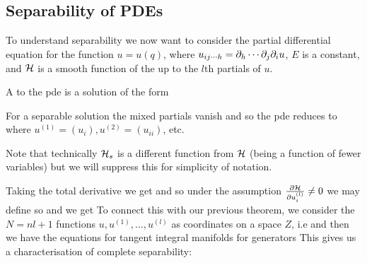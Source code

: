 \documentclass{article}
\begin{document}
\subsection{Separability of PDEs}

To understand separability we now want to consider the partial differential equation 
for the function $u = u(q)$, where $u_{ij \cdots h} = \del_h \cdots \del_j \del_i u$, $E$ is a constant, and $\mc{H}$ is a smooth function of the up to the $l$th partials of $u$. 

\begin{definition}
A  to the pde is a solution of the form 
\end{definition}

For a separable solution the mixed partials vanish and so the pde reduces to 
where $u^{(1)} = (u_i), u^{(2)} = (u_{ii})$, etc. 

\begin{notation}
Note that technically $\mc{H}_s$ is a different function from $\mc{H}$ (being a function of fewer variables) but we will suppress this for simplicity of notation. 
\end{notation}

Taking the total derivative we get 
and so under the assumption $\pd[\mc{H}]{u_i^{(l)}} \neq 0$ we may define 
so 
and we get
To connect this with our previous theorem, we consider the $N = nl+1$ functions $u,u^{(1)}, \dots, u^{(l)}$ as coordinates on a space $Z$, i.e 
and then we have the equations for tangent integral manifolds for generators 
This gives us a characterisation of complete separability:
\end{document}
